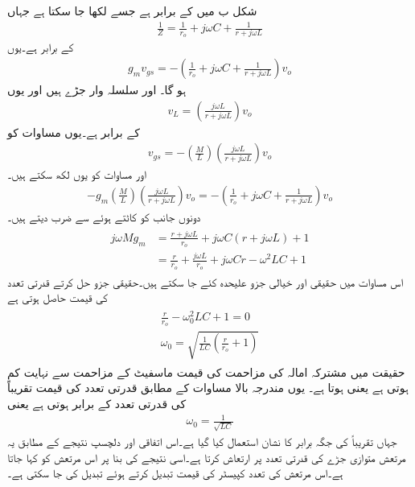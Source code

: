 شکل  ب میں  کے برابر ہے جسے  لکھا جا سکتا ہے جہاں
\begin{align*}
\frac{1}{Z}=\frac{1}{r_o}+j \omega C +\frac{1}{r +j \omega L}
\end{align*}
کے برابر ہے۔یوں
\begin{align} \label{مساوات_امالہ_کپیسٹر_مرتعش_برقی_رو}
g_m v_{gs}=-\left(\frac{1}{r_o}+j \omega C +\frac{1}{r +j \omega L} \right) v_o
\end{align}
 ہو گا۔ اور  سلسلہ وار جڑے ہیں اور یوں
\begin{align}
v_L =\left( \frac{j \omega L}{r+j \omega L} \right) v_o
\end{align}
کے برابر ہے۔یوں مساوات  کو
\begin{align}
v_{gs}=-\left(\frac{M}{L} \right) \left( \frac{j \omega L}{r+j \omega L} \right) v_o
\end{align}
اور مساوات  کو یوں لکھ سکتے ہیں۔
\begin{align*}
-g_m \left(\frac{M}{L} \right) \left( \frac{j \omega L}{r+j \omega L} \right) v_o=-\left(\frac{1}{r_o}+j \omega C +\frac{1}{r +j \omega L} \right) v_o
\end{align*}
دونوں جانب  کو کاٹتے ہوئے  سے ضرب دیتے ہیں۔
\begin{gather}
\begin{aligned} \label{مساوات_امالہ_کپیسٹر_مرتعش_مساوات}
j \omega M g_m &=\frac{r+j \omega L}{r_o}+j \omega C \left(r+j \omega L \right) +1  \\
&=\frac{r}{r_o}+\frac{j \omega L }{r_o}+j \omega C r-\omega^2 LC+1 
\end{aligned}
\end{gather}
اس مساوات میں حقیقی اور خیالی جزو علیحدہ کئے جا سکتے ہیں۔حقیقی جزو حل کرتے قدرتی تعدد  کی قیمت حاصل ہوتی ہے
\begin{gather}
\begin{aligned}
\frac{r}{r_o}-\omega_0^2 LC +1 =0 \\
\omega_0 = \sqrt{\frac{1}{LC} \left(\frac{r}{r_o}+1 \right)}
\end{aligned}
\end{gather}
حقیقت میں مشترکہ امالہ کی مزاحمت  کی قیمت ماسفیٹ کے مزاحمت  سے نہایت کم ہوتی ہے یعنی  ہوتا ہے۔ یوں مندرجہ بالا مساوات کے مطابق قدرتی تعدد کی قیمت تقریباً  کی قدرتی تعدد کے برابر ہوتی ہے یعنی
\begin{align}
\omega_0 = \frac{1}{\sqrt{LC}}
\end{align}
جہاں تقریباً کی جگہ برابر کا نشان استعمال کیا گیا ہے۔اس اتفاقی اور دلچسپ نتیجے کے مطابق یہ مرتعش متوازی جڑے  کی قدرتی تعدد پر ارتعاش کرتا ہے۔اسی نتیجے کی بنا پر اس مرتعش کو   کہا جاتا ہے۔اس مرتعش کی تعدد کپیسٹر  کی قیمت تبدیل کرتے ہوئے تبدیل کی جا سکتی ہے۔

